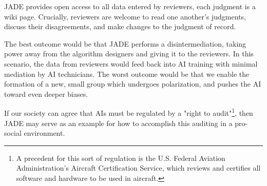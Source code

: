 \documentclass[format=sigconf]{acmart}
\begin{document}
JADE provides open access to all data entered by reviewers, each judgment is a wiki page.  Crucially, reviewers are welcome to read one another's judgments, discuss their disagreements, and make changes to the judgment of record.

The best outcome would be that JADE performs a disintermediation, taking power away from the algorithm designers and giving it to the reviewers.  In this scenario, the data from reviewers would feed back into AI training with minimal mediation by AI technicians.  The worst outcome would be that we enable the formation of a new, small group which undergoes polarization, and pushes the AI toward even deeper biases.

If our society can agree that AIs must be regulated by a "right to audit"\footnote{A precedent for this sort of regulation is the U.S. Federal Aviation Administration's Aircraft Certification Service, which reviews and certifies all software and hardware to be used in aircraft.}, then JADE may serve as an example for how to accomplish this auditing in a pro-social environment.


\end{document}
